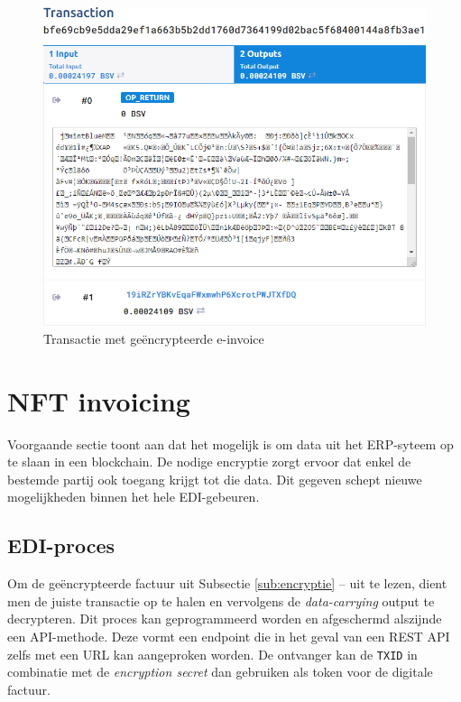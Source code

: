 \begin{figure}[H]
	\centering
	\includegraphics[width=\linewidth]{img/proof-of-concept/transactie-encryptie.png}
	\caption{\label{fig:transactie-encryptie}Transactie met geëncrypteerde e-invoice}
\end{figure}


\section{NFT invoicing}
\label{nft-invoicing}

Voorgaande sectie toont aan dat het mogelijk is om data uit het ERP-syteem op te slaan in een blockchain. De nodige encryptie zorgt ervoor dat enkel de bestemde partij ook toegang krijgt tot die data. Dit gegeven schept nieuwe mogelijkheden binnen het hele EDI-gebeuren.

\subsection{EDI-proces}
\label{sub:edi-proces}

Om de geëncrypteerde factuur uit Subsectie \ref{sub:encryptie} --  uit te lezen, dient men de juiste transactie op te halen en vervolgens de \textit{data-carrying} output te decrypteren. Dit proces kan geprogrammeerd worden en afgeschermd alszijnde een API-methode. Deze vormt een endpoint die in het geval van een REST API zelfs met een URL kan aangeproken worden. De ontvanger kan de \verb|TXID| in combinatie met de \textit{encryption secret} dan gebruiken als token voor de digitale factuur.

